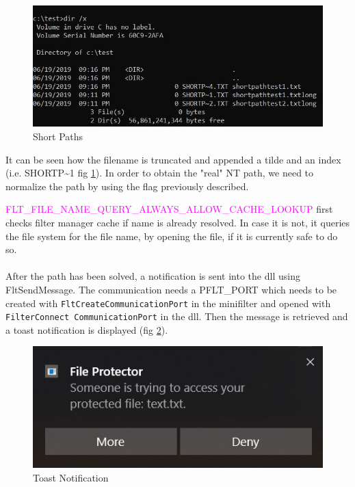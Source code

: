 		\begin{figure}[h!]
			\begin{center}
				\includegraphics{images/ShortPaths.jpg}
				\caption{Short Paths}
				\label{fig:ShortPaths}
			\end{center}
		\end{figure}
	
		It can be seen how the filename is truncated and appended a tilde and an index (i.e. SHORTP\textasciitilde1 fig \ref{fig:ShortPaths}). In order to obtain the "real" NT path, we need to normalize the path by using the flag previously described.
		
		\textcolor{magenta}{FLT\_FILE\_NAME\_QUERY\_ALWAYS\_ALLOW\_CACHE\_LOOKUP} first checks filter manager cache if name is already resolved. In case it is not, it queries the file system for the file name, by opening the file, if it is currently safe to do so.
		
		\paragraph{}
		After the path has been solved, a notification is sent into the dll using FltSendMessage. The communication needs a \textcolor{Emerald}{PFLT\_PORT} which needs to be created with \texttt{FltCreateCommunicationPort} in the minifilter and opened with \texttt{FilterConnect CommunicationPort} in the dll. Then the message is retrieved and a toast notification is displayed (fig \ref{fig:ToastNotification}).
		
		\begin{figure}[h!]
			\begin{center}
				\includegraphics{images/ToastNotification.jpg}
				\caption{Toast Notification}
				\label{fig:ToastNotification}
			\end{center}
		\end{figure}
	
